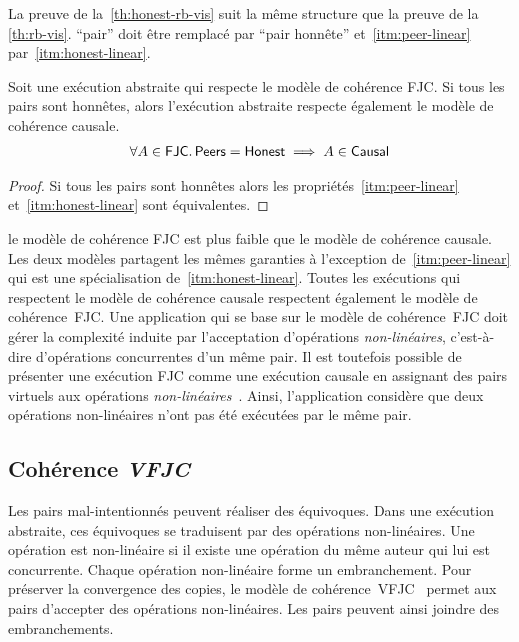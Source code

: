 La preuve de la~\autoref{th:honest-rb-vis} suit la même structure que la preuve de la \autoref{th:rb-vis}.
\enquote{pair} doit être remplacé par \enquote{pair honnête} et~\ref{itm:peer-linear} par~\ref{itm:honest-linear}.

\begin{proposition}\label{th:causal-fjc}
Soit une exécution abstraite qui respecte le modèle de cohérence \ac{FJC}.
Si tous les pairs sont honnêtes, alors l'exécution abstraite respecte également le modèle de cohérence causale.
\begin{equation*}\begin{split}
    \forall A \in \operatorname{\mathsf{FJC}} \ldotp \operatorname{\mathsf{Peers}} = \operatorname{\mathsf{Honest}} \implies A \in \operatorname{\mathsf{Causal}}
\end{split}\end{equation*}
\end{proposition}

\begin{proof}
Si tous les pairs sont honnêtes alors les propriétés~\ref{itm:peer-linear} et~\ref{itm:honest-linear} sont équivalentes.
\end{proof}

le modèle de cohérence \ac{FJC} est plus faible que le modèle de cohérence causale.
Les deux modèles partagent les mêmes garanties à l'exception de~\ref{itm:peer-linear} qui est une spécialisation de~\ref{itm:honest-linear}.
Toutes les exécutions qui respectent le modèle de cohérence causale respectent également le modèle de cohérence~\ac{FJC}.
Une application qui se base sur le modèle de cohérence~\ac{FJC} doit gérer la complexité induite par l'acceptation d'opérations \emph{non-linéaires}, c'est-à-dire d'opérations concurrentes d'un même pair.
Il est toutefois possible de présenter une exécution \ac{FJC} comme une exécution causale en assignant des pairs virtuels aux opérations \emph{non-linéaires}~\autocite{mahajan_depot_2011}.
Ainsi, l'application considère que deux opérations non-linéaires n'ont pas été exécutées par le même pair.


\subsection{Cohérence \emph{\acl{VFJC}}}

Les pairs mal-intentionnés peuvent réaliser des équivoques.
Dans une exécution abstraite, ces équivoques se traduisent par des opérations non-linéaires.
Une opération est non-linéaire si il existe une opération du même auteur qui lui est concurrente.
Chaque opération non-linéaire forme un embranchement.
Pour préserver la convergence des copies, le modèle de cohérence~\acf{VFJC}~\autocite{mahajan_2011_cac} permet aux pairs d'accepter des opérations non-linéaires.
Les pairs peuvent ainsi joindre des embranchements.

